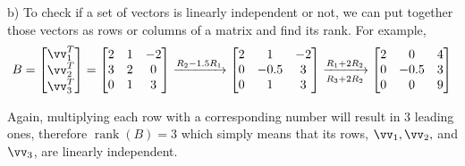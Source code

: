 \begin{solution}
b) To check if a set of vectors is linearly independent or not, we can put together those vectors as rows or columns of a matrix and find its rank. For example, 
\[B=
\begin{bmatrix}
     \vv_1^T \\ \vv_2^T \\ \vv_3^T
\end{bmatrix}
 =
 \begin{bmatrix}
     2 & 1 & -2 \\
     3 & 2 & 0 \\
     0 & 1 & 3
 \end{bmatrix}
 \xrightarrow{R_2 -1.5 R_1}
 \begin{bmatrix}
     2 & 1 & -2 \\
     0 & -0.5 & 3 \\
     0 & 1 & 3
 \end{bmatrix}
 \xrightarrow[R_3 + 2R_2]{R_1+2R_2}
 \begin{bmatrix}
     2 & 0 & 4 \\
     0 & -0.5 & 3 \\
     0 & 0 & 9
 \end{bmatrix}
 \]

 Again, multiplying each row with a corresponding number will result in 3 leading ones, therefore $\operatorname{rank}(B)=3$ which simply means that its rows, $\vv_1,\vv_2,$ and $\vv_3$, are linearly independent.

 \end{solution}
 \bigskip

